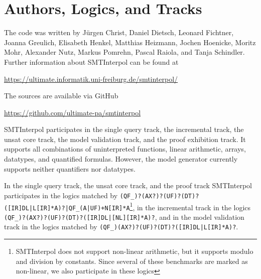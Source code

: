 \documentclass[a4paper]{easychair}
\newcommand\SI{SMTInterpol\xspace}
\begin{document}
\section*{Authors, Logics, and Tracks}
The code was written by J{\"u}rgen Christ, Daniel Dietsch, Leonard Fichtner, Joanna Greulich, Elisabeth Henkel, Matthias Heizmann, Jochen Hoenicke, Moritz Mohr, Alexander Nutz, Markus Pomrehn, Pascal Raiola, and Tanja Schindler.
Further information about \SI can be found at
\begin{center}
  \url{https://ultimate.informatik.uni-freiburg.de/smtinterpol/}
\end{center}
The sources are available via GitHub
\begin{center}
  \url{https://github.com/ultimate-pa/smtinterpol}
\end{center}

\SI participates in the single query track, the incremental track, the unsat core track, the model validation track, and the proof exhibition track.
It supports all combinations of uninterpreted functions, linear arithmetic, arrays, datatypes, and quantified formulas.
However, the model generator currently supports neither quantifiers nor datatypes.

In the single query track, the unsat core track, and the proof track \SI participates in the logics matched by
\verb!(QF_)?(AX?)?(UF)?(DT)?([IR]DL|L[IR]*A)?|QF_(A|UF)+N[IR]*A!\footnote{\SI does not support non-linear arithmetic, but it supports modulo and division by constants.  Since several of these benchmarks are marked as non-linear, we also participate in these logics}, 
in the incremental track in the logics
\verb!(QF_)?(AX?)?(UF)?(DT)?([IR]DL|[NL][IR]*A)?!,
and in the model validation track in the logics matched by
\verb!(QF_)(AX?)?(UF)?(DT)?([IR]DL|L[IR]*A)?!.



\end{document}
